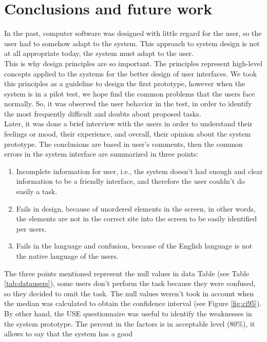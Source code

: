\chapter{Conclusions and future work} \label{conclusions}

In the past, computer software was designed with little regard for the
user, so the user had to somehow adapt to the system. This approach to
system design is not at all appropriate today, the system must adapt
to the user. \\ This is why design principles  \cite{gong2004guidelines} 
are so important. The principles represent high-level concepts 
applied to the systems for the better design of user interfaces. 
We took this principles as a guideline to design the first prototype, 
however  when the system is in a pilot test, we hope find the 
common problems that the users face normally.
So, it was observed the user behavior in the test, in order to identify
the most frequently difficult and doubts about proposed tasks.\\ 
Later, it was done a brief interview with the users in order to 
understand their feelings or mood, their
experience, and overall, their opinion about the system prototype.  
The conclusions are based in user's comments, then the common errors 
in the system interface are summarized in three points:
\begin{enumerate}  
\item  Incomplete information for user, i.e., the system doesn't had
enough and clear information to be a friendly interface, and
therefore the user couldn't do easily a task.
\item Fails in design, because of unordered elements in the screen, 
in other words, the elements are not in the correct site into the 
screen to be easily identified per users.
\item Fails in the language and confusion, because of the English 
language is not the native language of the users.
\end{enumerate}
The three points mentioned represent the null values in data
Table (see Table  \ref{tab:datausers}), some users don't perform the task
because they were confused, so they decided to omit the task. The null
values weren't took in account when the median was calculated to obtain the
confidence interval (see Figure  \ref{fig:ci95}).\\  
By other hand, the USE questionnaire was useful to identify the
weaknesses in the system prototype. The percent in the factors is in
acceptable level (80\%), it allows to say that the system has a good
